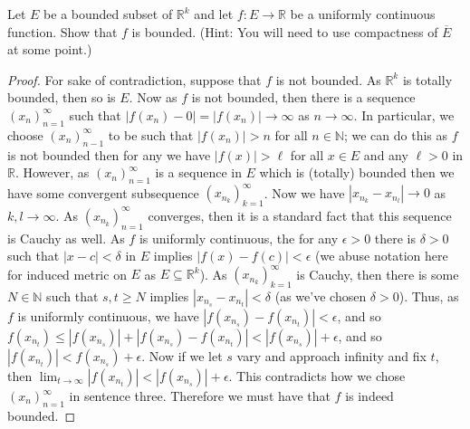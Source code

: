 \documentclass[oneside]{amsart}
\theoremstyle{definition}
\newcommand{\rr}{\mathbb R}
\newcommand{\nn}{\mathbb N}
\begin{document}
\begin{tcolorbox}[colback=black!5!white,colframe=black!75!black,title= Chapter $5$; $\S 2.3$: Exercise $2.9.$] Let $E$ be a bounded subset of $\rr^k$ and let $f \colon E \to \rr$ be a uniformly continuous function. Show that $f$ is bounded. (Hint: You will need to use compactness of $\overline{E}$ at some point.)
\tcblower 
\begin{proof} For sake of contradiction, suppose that $f$ is not bounded. As $\rr^k$ is totally bounded, then so is $E$. Now as $f$ is not bounded, then there is a sequence $(x_n)_{n=1}^\infty$ such that $|f(x_n) - 0| = |f(x_n)| \to \infty$ as $n \to \infty$. In particular, we choose $(x_n)_{n-1}^\infty$ to be such that $|f(x_n)| > n$ for all $n \in \nn$; we can do this as $f$ is not bounded then for any we have $|f(x)|> \ell $ for all $x \in E$ and any $\ell > 0$ in $\rr$. However, as $(x_n)_{n=1}^\infty$ is a sequence in $E$ which is (totally) bounded then we have some convergent subsequence $(x_{n_k})_{k=1}^\infty$. Now we have $|x_{n_k} - x_{n_l}| \to 0$ as $k,l \to \infty$. As $(x_{n_k})_{n=1}^\infty$ converges, then it is a standard fact that this sequence is Cauchy as well. As $f$ is uniformly continuous, the for any $\epsilon > 0$ there is $\delta > 0$ such that $|x-c| < \delta $ in $E$ implies $|f(x) - f(c) | < \epsilon$ (we abuse notation here for induced metric on $E$ as $E \subseteq \rr^k$). As $(x_{n_k})_{k=1}^\infty$ is Cauchy, then there is some $N \in \nn$ such that $s,t\geq N$ implies $|x_{n_s} - x_{n_t}|< \delta$ (as we've chosen $\delta > 0$). Thus, as $f$ is uniformly continuous, we have $| f(x_{n_s} )- f( x_{n_t})| < \epsilon$, and so $f( x_{n_t}) \leq |f(x_{n_s} )|+ |f(x_{n_s} )- f( x_{n_t})| < |f( x_{n_s})|+ \epsilon$, and so $|f( x_{n_t})| < f( x_{n_s}) + \epsilon$. Now if we let $s$ vary and approach infinity and fix $t$, then $\lim _{t \to \infty} |f( x_{n_t} )| < |f( x_{n_s})| + \epsilon$. This contradicts how we chose $(x_n)_{n=1}^\infty$ in sentence three. Therefore we must have that $f$ is indeed bounded. 
\end{proof}
\end{tcolorbox}
\end{document}
